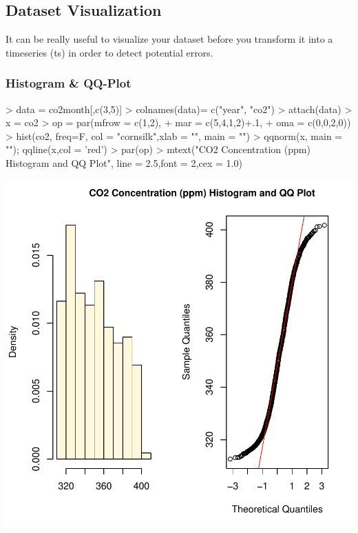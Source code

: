 \documentclass[11pt, a4paper]{article} %
\begin{document}
\subsection{Dataset Visualization}%
It can be really useful to visualize your dataset before you transform it into a timeseries (ts) in order to detect potential errors.

\subsubsection{Histogram \& QQ-Plot}
\begin{Schunk}
\begin{Sinput}
> data = co2month[,c(3,5)]
> colnames(data)= c("year", "co2")
> attach(data)
> x = co2
> op = par(mfrow = c(1,2),
+           mar = c(5,4,1,2)+.1,
+           oma = c(0,0,2,0))
> hist(co2, freq=F, col = "cornsilk",xlab = "", main = "")
> qqnorm(x, main = ""); qqline(x,col = 'red')
> par(op)
> mtext("CO2 Concentration (ppm) Histogram and QQ Plot", line = 2.5,font = 2,cex = 1.0)
\end{Sinput}
\end{Schunk}
\includegraphics{sweaveclean-fig1check}
\end{document}

